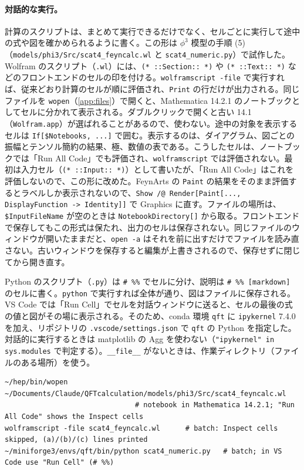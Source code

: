 \documentclass[a4paper,10pt]{ltjsarticle}
\begin{document}
\paragraph{対話的な実行。}計算のスクリプトは、まとめて実行できるだけでなく、セルごとに実行して途中の式や図を確かめられるように書く。この形は $\phi^3$ 模型の手順 (5)（\nolinkurl{models/phi3/Src/scat4_feyncalc.wl} と \nolinkurl{scat4_numeric.py}）で試作した。Wolfram のスクリプト（\texttt{.wl}）には、\texttt{(* ::Section:: *)} や \texttt{(* ::Text:: *)} などのフロントエンドのセルの印を付ける。\texttt{wolframscript -file} で実行すれば、従来どおり計算のセルが順に評価され、\texttt{Print} の行だけが出力される。同じファイルを \texttt{wopen}（\ref{app:files}）で開くと、Mathematica 14.2.1 のノートブックとしてセルに分かれて表示される。ダブルクリックで開くと古い 14.1（\texttt{Wolfram.app}）が選ばれることがあるので、使わない。途中の対象を表示するセルは \texttt{If[\$Notebooks, ...]} で囲む。表示するのは、ダイアグラム、図ごとの振幅とテンソル簡約の結果、極、数値の表である。こうしたセルは、ノートブックでは「Run All Code」でも評価され、\texttt{wolframscript} では評価されない。最初は入力セル（\texttt{(* ::Input:: *)}）として書いたが、「Run All Code」はこれを評価しないので、この形に改めた。FeynArts の \texttt{Paint} の結果をそのまま評価するとラベルしか表示されないので、\texttt{Show /@ Render[Paint[..., DisplayFunction -> Identity]]} で Graphics に直す。ファイルの場所は、\texttt{\$InputFileName} が空のときは \texttt{NotebookDirectory[]} から取る。フロントエンドで保存してもこの形式は保たれ、出力のセルは保存されない。同じファイルのウィンドウが開いたままだと、\texttt{open -a} はそれを前に出すだけでファイルを読み直さない。古いウィンドウを保存すると編集が上書きされるので、保存せずに閉じてから開き直す。

Python のスクリプト（\texttt{.py}）は \texttt{\# \%\%} でセルに分け、説明は \texttt{\# \%\% [markdown]} のセルに書く。\texttt{python} で実行すれば全体が通り、図はファイルに保存される。VS Code では「Run Cell」でセルを対話ウィンドウに送ると、セルの最後の式の値と図がその場に表示される。そのため、conda 環境 \texttt{qft} に \texttt{ipykernel} 7.4.0 を加え、リポジトリの \nolinkurl{.vscode/settings.json} で \texttt{qft} の Python を指定した。対話的に実行するときは matplotlib の Agg を使わない（\texttt{"ipykernel" in sys.modules} で判定する）。\texttt{\_\_file\_\_} がないときは、作業ディレクトリ（ファイルのある場所）を使う。

\begin{Verbatim}
~/hep/bin/wopen ~/Documents/Claude/QFTcalculation/models/phi3/Src/scat4_feyncalc.wl
                               # notebook in Mathematica 14.2.1; "Run All Code" shows the Inspect cells
wolframscript -file scat4_feyncalc.wl      # batch: Inspect cells skipped, (a)/(b)/(c) lines printed
~/miniforge3/envs/qft/bin/python scat4_numeric.py   # batch; in VS Code use "Run Cell" (# %%)
\end{Verbatim}
\end{document}
